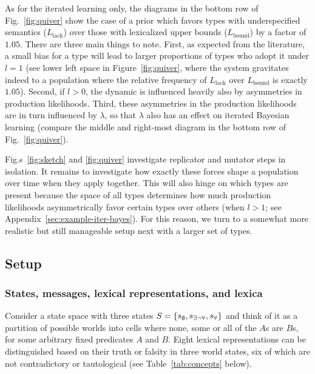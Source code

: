 \documentclass[a4paper, 11pt]{article}
\theoremstyle{Satz}
\newcommand{\set}[1]{\left\{#1\right\}}
\newcommand{\States}{\ensuremath{S}\xspace}		%
\newcommand{\state}{\ensuremath{s}\xspace}		%
\newcommand{\mystate}[1]{\ensuremath{\state_{\text{#1}}}\xspace} %
\newcommand{\mylang}[1]{\ensuremath{L_{\text{#1}}}\xspace} %
\newcommand{\ssome}{\mystate{\ensuremath{\exists\neg\forall}}}
\newcommand{\sall}{\mystate{\ensuremath{\forall}}}
\newcommand{\snone}{\mystate{\ensuremath{\emptyset}}}
\newcommand{\Lbound}{\mylang{bound}}
\newcommand{\Llack}{\mylang{lack}}
\begin{document}
As for the iterated learning only, the diagrams in the bottom row of Fig.~\ref{fig:quiver} show
the case of a prior which favors types with underspecified semantics ($\Llack$) over those with
lexicalized upper bounds ($\Lbound$) by a factor of $1.05$. There are three main things to
note. First, as expected from the literature, a small bias for a type will lead to larger
proportions of types who adopt it under $l=1$ (see lower left space in Figure~\ref{fig:quiver},
where the system gravitates indeed to a population where the relative frequency of $\Llack$
over $\Lbound$ is exactly $1.05$). Second, if $l>0$, the dynamic is influenced heavily also by
asymmetries in production likelihoods. Third, these asymmetries in the production likelihoods
are in turn influenced by $\lambda$, so that $\lambda$ also has an effect on iterated Bayesian
learning (compare the middle and right-most diagram in the bottom row of
Fig.~\ref{fig:quiver}).

Fig.s~\ref{fig:sketch} and \ref{fig:quiver} investigate replicator and mutator steps in
isolation. It remains to investigate how exactly these forces shape a population over time when
they apply together. This will also hinge on which types are present because the space of all
types determines how much production likelihoods asymmetrically favor certain types over others
(when $l>1$; see Appendix~\ref{sec:example-iter-bayes}). For this reason, we turn to a somewhat
more realistic but still manageable setup next with a larger set of types.



\subsection{Setup}
\label{sec:setup:-stat-conc}


\subsubsection{States, messages, lexical representations, and lexica} 
\label{sec:stat-mess-conc}

Consider a state space with three states $\States = \set{\snone, \ssome, \sall}$ and think of
it as a partition of possible worlds into cells where none, some or all of the $A$s are $B$s,
for some arbitrary fixed predicates $A$ and $B$. Eight lexical representations can be
distinguished based on their truth or falsity in three world states, six of which are not
contradictory or tautological (see Table~\ref{tab:concepts} below).
\end{document}
